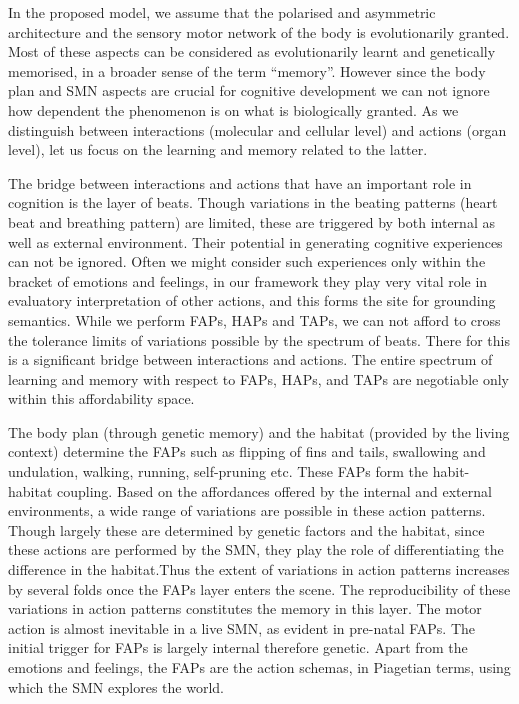 In the proposed model, we assume that the polarised and asymmetric architecture and the sensory motor network of the body is evolutionarily granted. Most of these aspects can be considered as evolutionarily learnt and genetically memorised, in a broader sense of the term ``memory''. However since the body plan and SMN aspects are crucial for cognitive development we can not ignore how dependent the phenomenon is on what is biologically granted. As we distinguish between interactions (molecular and cellular level) and actions (organ level), let us focus on the learning and memory related to the latter. 

The bridge between interactions and actions that have an important role in cognition is the layer of beats. Though variations in the beating patterns (heart beat and breathing pattern) are limited, these are triggered by both internal as well as external environment. Their potential in generating cognitive experiences can not be ignored. Often we might consider such experiences only within the bracket of emotions and feelings, in our framework they play very vital role in evaluatory interpretation of other actions, and this forms the site for grounding semantics. While we perform FAPs, HAPs and TAPs, we can not afford to cross the tolerance limits of variations possible by the spectrum of beats. There for this is a significant bridge between interactions and actions. The entire spectrum of learning and memory with respect to FAPs, HAPs, and TAPs are negotiable only within this affordability space. 

The body plan (through genetic memory) and the habitat (provided by the living context) determine the FAPs such as flipping of fins and tails, swallowing and undulation, walking, running, self-pruning etc. These FAPs form the habit-habitat coupling. Based on the affordances offered by the internal and external environments, a wide range of variations are possible in these action patterns. Though largely these are determined by genetic factors and the habitat, since these actions are performed by the SMN, they play the role of differentiating the difference in the habitat.Thus the extent of variations in action patterns increases by several folds once the FAPs layer enters the scene. The reproducibility of these variations in action patterns constitutes the memory in this layer. The motor action is almost inevitable in a live SMN, as evident in pre-natal FAPs. The initial trigger for FAPs is largely internal therefore genetic. Apart from the emotions and feelings, the FAPs are the action schemas, in Piagetian terms, using which the SMN explores the world. 

